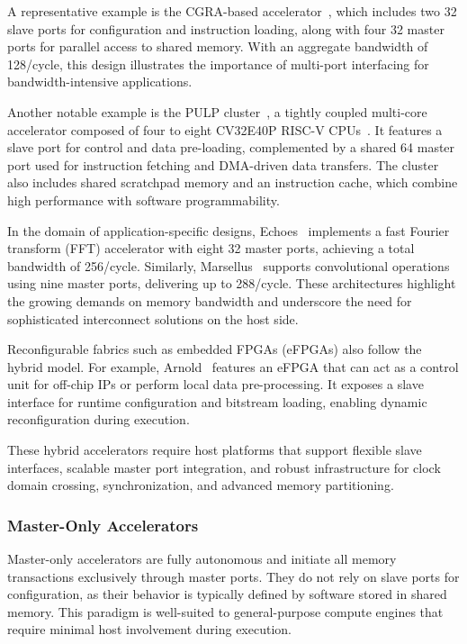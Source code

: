                 A representative example is the CGRA-based accelerator~\cite{oe-cgra}, which includes two \SI{32}{\bit} slave ports for configuration and instruction loading, along with four \SI{32}{\bit} master ports for parallel access to shared memory. With an aggregate bandwidth of \SI{128}{\bit}/cycle, this design illustrates the importance of multi-port interfacing for bandwidth-intensive applications.
                
                Another notable example is the PULP cluster~\cite{pulp_cluster}, a tightly coupled multi-core accelerator composed of four to eight CV32E40P RISC-V CPUs~\cite{ri5cy}. It features a slave port for control and data pre-loading, complemented by a shared \SI{64}{\bit} master port used for instruction fetching and DMA-driven data transfers. The cluster also includes shared scratchpad memory and an instruction cache, which combine high performance with software programmability.
                
                In the domain of application-specific designs, Echoes~\cite{fft} implements a fast Fourier transform (FFT) accelerator with eight \SI{32}{\bit} master ports, achieving a total bandwidth of \SI{256}{\bit}/cycle. Similarly, Marsellus~\cite{cnn} supports convolutional operations using nine master ports, delivering up to \SI{288}{\bit}/cycle. These architectures highlight the growing demands on memory bandwidth and underscore the need for sophisticated interconnect solutions on the host side.
                
                Reconfigurable fabrics such as embedded FPGAs (eFPGAs) also follow the hybrid model. For example, Arnold~\cite{arnold} features an eFPGA that can act as a control unit for off-chip IPs or perform local data pre-processing. It exposes a slave interface for runtime configuration and bitstream loading, enabling dynamic reconfiguration during execution.
                
                These hybrid accelerators require host platforms that support flexible slave interfaces, scalable master port integration, and robust infrastructure for clock domain crossing, synchronization, and advanced memory partitioning.
    
            \subsubsection*{Master-Only Accelerators}
            
                Master-only accelerators are fully autonomous and initiate all memory transactions exclusively through master ports. They do not rely on slave ports for configuration, as their behavior is typically defined by software stored in shared memory. This paradigm is well-suited to general-purpose compute engines that require minimal host involvement during execution.
                
